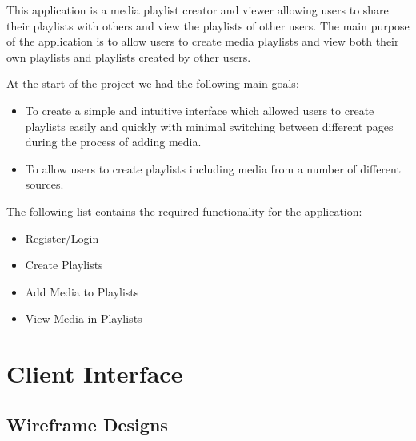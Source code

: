 \documentclass{sig-alt-release2}
\begin{document}
This application is a media playlist creator and viewer allowing users to share their playlists with others and view the playlists of other users. The main purpose of the application is to allow users to create media playlists and view both their own playlists and playlists created by other users.

At the start of the project we had the following main goals:
\begin{itemize}
\item To create a simple and intuitive interface which allowed users to create playlists easily and quickly with minimal switching between different pages during the process of adding media.
\item To allow users to create playlists including media from a number of different sources.
\end{itemize}

The following list contains the required functionality for the application:

\begin{itemize}
\item Register/Login
\item Create Playlists
\item Add Media to Playlists
\item View Media in Playlists
\end{itemize} 

\section{Client Interface}
\subsection{Wireframe Designs}
\end{document}
